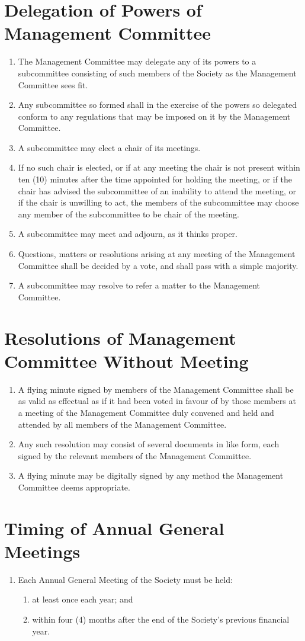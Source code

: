 \documentclass[a4paper]{article}
\newcommand*{\sectionr}[1]{{\raggedright \section{#1}}}
\begin{document}
\sectionr{Delegation of Powers of Management Committee}
\begin{enumerate}
\item The Management Committee may delegate any of its powers to a subcommittee consisting of such members of the Society as the Management Committee sees fit.
\item Any subcommittee so formed shall in the exercise of the powers so delegated conform to any regulations that may be imposed on it by the Management Committee.
\item A subcommittee may elect a chair of its meetings.
\item If no such chair is elected, or if at any meeting the chair is not present within ten (10) minutes after the time appointed for holding the meeting, or if the chair has advised the subcommittee of an inability to attend the meeting, or if the chair is unwilling to act, the members of the subcommittee may choose any member of the subcommittee to be chair of the meeting.
\item A subcommittee may meet and adjourn, as it thinks proper.
\item Questions, matters or resolutions arising at any meeting of the Management Committee shall be decided by a vote, and shall pass with a simple majority.
\item A subcommittee may resolve to refer a matter to the Management Committee.
\end{enumerate}

\sectionr{Resolutions of Management Committee Without Meeting}
\begin{enumerate}
\item A flying minute signed by members of the Management Committee shall be as valid as effectual as if it had been voted in favour of by those members at a meeting of the Management Committee duly convened and held and attended by all members of the Management Committee.
\item Any such resolution may consist of several documents in like form, each signed by the relevant members of the Management Committee.
\item A flying minute may be digitally signed by any method the Management Committee deems appropriate.
\end{enumerate}

\sectionr{Timing of Annual General Meetings}
\begin{enumerate}
\item Each Annual General Meeting of the Society must be held:
	\begin{enumerate}
	\item at least once each year; and
	\item within four (4) months after the end of the Society's previous financial year.
	\end{enumerate}
\end{enumerate}
\end{document}
